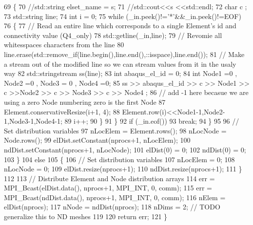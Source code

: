 \begin{DoxyCode}
69       \{
70         \textcolor{comment}{//std::string elset\_name = s;}
71         \textcolor{comment}{//std::cout<<s <<std::endl;}
72         \textcolor{keywordtype}{char} c ;
73         std::string line;
74         \textcolor{keywordtype}{int} i = 0;
75         \textcolor{keywordflow}{while} (\_in.peek()!=\textcolor{charliteral}{'*'}&&\_in.peek()!=EOF)
76         \{
77           \textcolor{comment}{// Read an entire line which corresponds to a single Element's id and connectivity value
       (Q4\_only)}
78           std::getline(\_in,line);
79           \textcolor{comment}{// Revomie all whitesspaces characters from the line}
80           line.erase(std::remove\_if(line.begin(),line.end(),::isspace),line.end());
81           \textcolor{comment}{// Make a stream out of the modified line so we can stream values from it in the usaly way}
82           std::stringstream ss(line);
83           \textcolor{keywordtype}{int} abaqus\_el\_id = 0;
84           \textcolor{keywordtype}{int} Node1 =0 , Node2 =0 , Node3 = 0 , Node4 =0;
85           ss >> abaqus\_el\_id >> c >> Node1 >> c >>Node2 >> c >> Node3 >> c >> Node4 ;
86           \textcolor{comment}{// add -1 here becasue we are using a zero Node numbering zero is the first Node}
87           Element.conservativeResize(i+1, 4);
88           Element.row(i)<<Node1-1,Node2-1,Node3-1,Node4-1;
89           i++;
90         \}
91       \}
92       \textcolor{keywordflow}{if} (\_in.eof())
93         \textcolor{keywordflow}{break};
94     \}
95 
96     \textcolor{comment}{// Set distribution variables}
97     nLocElem = Element.rows();
98     nLocNode = Node.rows();
99     elDist.setConstant(nprocs+1, nLocElem);
100     ndDist.setConstant(nprocs+1, nLocNode);
101     elDist(0) = 0;
102     ndDist(0) = 0;
103   \}
104   \textcolor{keywordflow}{else}
105   \{
106     \textcolor{comment}{// Set distribution variables}
107     nLocElem = 0;
108     nLocNode = 0;
109     elDist.resize(nprocs+1);
110     ndDist.resize(nprocs+1);
111   \}
112 
113   \textcolor{comment}{// Distribute Element and Node distribution arrays}
114   err = MPI\_Bcast(elDist.data(), nprocs+1, MPI\_INT, 0, comm);
115   err = MPI\_Bcast(ndDist.data(), nprocs+1, MPI\_INT, 0, comm);
116   nElem = elDist(nprocs);
117   nNode = ndDist(nprocs);
118   nDims = 2; \textcolor{comment}{// TODO generalize this to ND meshes}
119 
120   \textcolor{keywordflow}{return} err;
121 \}
\end{DoxyCode}
\mbox{\label{class_mesh_a1c915802d56c4ded24e460e83cfb5399}} 

